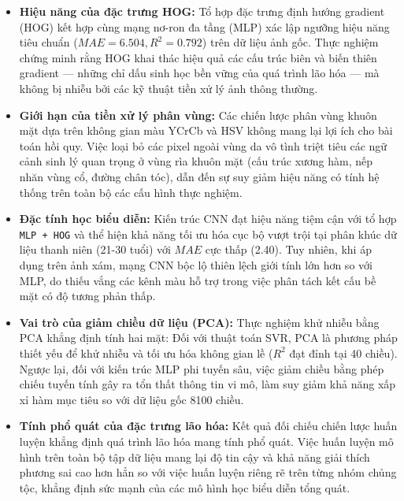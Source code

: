 \begin{itemize}
    \item \textbf{Hiệu năng của đặc trưng HOG:} Tổ hợp đặc trưng định hướng gradient (HOG) kết hợp cùng mạng nơ-ron đa tầng (MLP) xác lập ngưỡng hiệu năng tiêu chuẩn ($MAE = 6.504, R^2 = 0.792$) trên dữ liệu ảnh gốc. Thực nghiệm chứng minh rằng HOG khai thác hiệu quả các cấu trúc biên và biến thiên gradient — những chỉ dấu sinh học bền vững của quá trình lão hóa — mà không bị nhiễu bởi các kỹ thuật tiền xử lý ảnh thông thường.
    
    \item \textbf{Giới hạn của tiền xử lý phân vùng:} Các chiến lược phân vùng khuôn mặt dựa trên không gian màu YCrCb và HSV không mang lại lợi ích cho bài toán hồi quy. Việc loại bỏ các pixel ngoài vùng da vô tình triệt tiêu các ngữ cảnh sinh lý quan trọng ở vùng rìa khuôn mặt (cấu trúc xương hàm, nếp nhăn vùng cổ, đường chân tóc), dẫn đến sự suy giảm hiệu năng có tính hệ thống trên toàn bộ các cấu hình thực nghiệm.

    \item \textbf{Đặc tính học biểu diễn:} Kiến trúc CNN đạt hiệu năng tiệm cận với tổ hợp \texttt{MLP + HOG} và thể hiện khả năng tối ưu hóa cục bộ vượt trội tại phân khúc dữ liệu thanh niên (21-30 tuổi) với $MAE$ cực thấp (2.40). Tuy nhiên, khi áp dụng trên ảnh xám, mạng CNN bộc lộ thiên lệch giới tính lớn hơn so với MLP, do thiếu vắng các kênh màu hỗ trợ trong việc phân tách kết cấu bề mặt có độ tương phản thấp.

    \item \textbf{Vai trò của giảm chiều dữ liệu (PCA):} Thực nghiệm khử nhiễu bằng PCA khẳng định tính hai mặt: Đối với thuật toán SVR, PCA là phương pháp thiết yếu để khử nhiễu và tối ưu hóa không gian lề ($R^2$ đạt đỉnh tại 40 chiều). Ngược lại, đối với kiến trúc MLP phi tuyến sâu, việc giảm chiều bằng phép chiếu tuyến tính gây ra tổn thất thông tin vi mô, làm suy giảm khả năng xấp xỉ hàm mục tiêu so với dữ liệu gốc 8100 chiều.

    \item \textbf{Tính phổ quát của đặc trưng lão hóa:} Kết quả đối chiếu chiến lược huấn luyện khẳng định quá trình lão hóa mang tính phổ quát. Việc huấn luyện mô hình trên toàn bộ tập dữ liệu mang lại độ tin cậy và khả năng giải thích phương sai cao hơn hẳn so với việc huấn luyện riêng rẽ trên từng nhóm chủng tộc, khẳng định sức mạnh của các mô hình học biểu diễn tổng quát.
\end{itemize}


